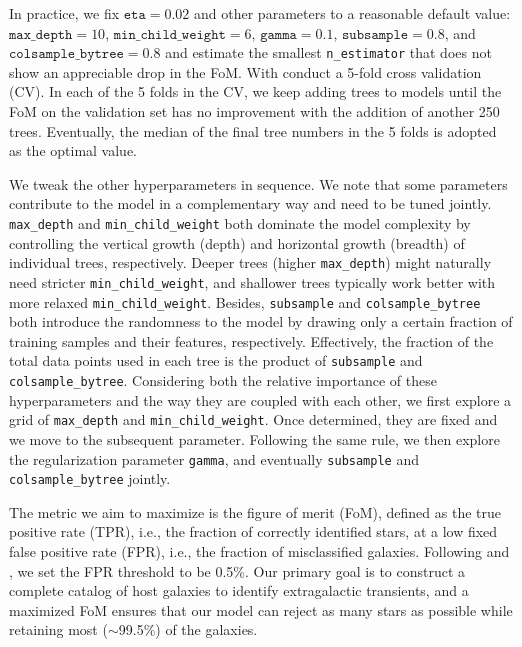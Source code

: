 \documentclass[twocolumn,tighten]{aastex631}
\begin{document}
\begin{CJK*}{UTF8}{gbsn}
In practice, we fix $\texttt{eta}=0.02$ and other parameters to a reasonable default value: $\texttt{max\_depth}=10$, $\texttt{min\_child\_weight}=6$, $\texttt{gamma}=0.1$, $\texttt{subsample}=0.8$, and $\texttt{colsample\_bytree}=0.8$ and estimate the smallest \texttt{n\_estimator} that does not show an appreciable drop in the FoM. With conduct a 5-fold cross validation (CV). In each of the 5 folds in the CV, we keep adding trees to models until the FoM on the validation set has no improvement with the addition of another 250 trees. Eventually, the median of the final tree numbers in the 5 folds is adopted as the optimal value. 

We tweak the other hyperparameters in sequence. We note that some parameters contribute to the model in a complementary way and need to be tuned jointly. \texttt{max\_depth} and \texttt{min\_child\_weight} both dominate the model complexity by controlling the vertical growth (depth) and horizontal growth (breadth) of individual trees, respectively. Deeper trees (higher \texttt{max\_depth}) might naturally need stricter \texttt{min\_child\_weight}, and shallower trees typically work better with more relaxed \texttt{min\_child\_weight}. Besides, \texttt{subsample} and \texttt{colsample\_bytree} both introduce the randomness to the model by drawing only a certain fraction of training samples and their features, respectively. Effectively, the fraction of the total data points used in each tree is the product of \texttt{subsample} and \texttt{colsample\_bytree}.
Considering both the relative importance of these hyperparameters and the way they are coupled with each other, we first explore a grid of \texttt{max\_depth} and \texttt{min\_child\_weight}. Once determined, they are fixed and we move to the subsequent parameter. Following the same rule, we then explore the regularization parameter \texttt{gamma}, and eventually \texttt{subsample} and \texttt{colsample\_bytree} jointly. 

The metric we aim to maximize is the figure of merit (FoM), defined as the true positive rate (TPR), i.e., the fraction of correctly identified stars, at a low fixed false positive rate (FPR), i.e., the fraction of misclassified galaxies. Following \cite{Miller_2017} and , we set the FPR threshold to be 0.5\%. Our primary goal is to construct a complete catalog of host galaxies to identify extragalactic transients, and a maximized FoM ensures that our model can reject as many stars as possible while retaining most ($\sim$99.5\%) of the galaxies.


\end{CJK*}
\end{document}
